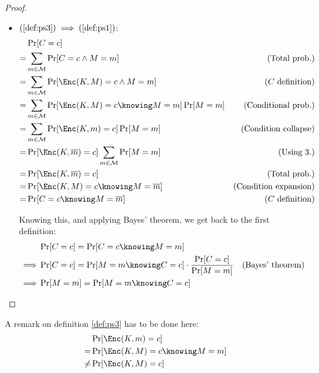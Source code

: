 \begin{proof}
\begin{itemize}
        \item $(\ref{def:ps3}) \implies (\ref{def:ps1})$:
        \begin{align*}
             & \Pr[C = c]                                                   & \\
            =& \sum_{m \in \M}\Pr[C = c \wedge M = m]                       & \text{(Total prob.)} \\
            =& \sum_{m \in \M}\Pr[\Enc(K, M) = c \wedge M = m]              & \text{($C$ definition)} \\
            =& \sum_{m \in \M}\Pr[\Enc(K, M) = c \knowing M = m] \Pr[M = m] & \text{(Conditional prob.)} \\
            =& \sum_{m \in \M}\Pr[\Enc(K, m) = c] \Pr[M = m]                & \text{(Condition collapse)} \\
            =& \Pr[\Enc(K, \overline{m}) = c] \sum_{m \in \M} \Pr[M = m]    & \text{(Using 3.)} \\
            =& \Pr[\Enc(K, \overline{m}) = c]                               & \text{(Total prob.)} \\
            =& \Pr[\Enc(K, M) = c \knowing M = \overline{m}]                & \text{(Condition expansion)} \\
            =& \Pr[C = c \knowing M = \overline{m}]                         & \text{($C$ definition)} \\
        \end{align*}

        Knowing this, and applying Bayes' theorem, we get back to the first definition:
        \begin{align*}
                    & \Pr[C = c] = \Pr[C = c \knowing M = m]                                        & \\
            \implies& \Pr[C = c] = \Pr[M = m \knowing C = c] \cdot \frac{\Pr[C = c]}{\Pr[M = m]}    & \text{(Bayes' theorem)} \\
            \implies& \Pr[M = m] = \Pr[M = m \knowing C = c]                                        & \\
        \end{align*}
    \end{itemize}
\end{proof}

A remark on definition \ref{def:ps3} has to be done here:
\begin{align*}
        & \Pr[\Enc(K, m) = c] \\
       =& \Pr[\Enc(K, M) = c \knowing M = m] \\
    \neq& \Pr[\Enc(K, M) = c]
\end{align*}

